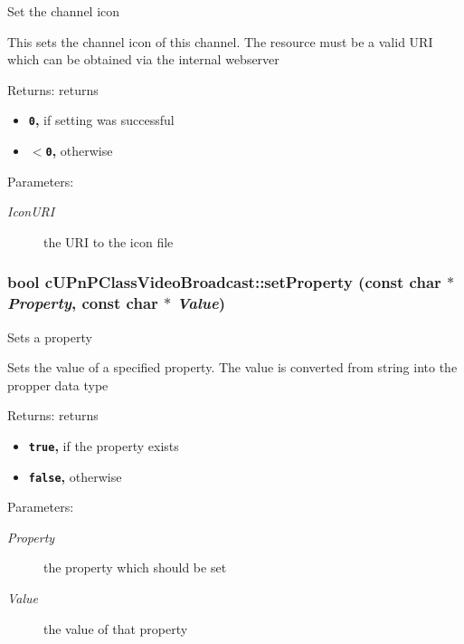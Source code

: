 Set the channel icon

This sets the channel icon of this channel. The resource must be a valid URI which can be obtained via the internal webserver

\begin{Desc}
\item[Returns:]returns\begin{itemize}
\item {\bf {\tt 0},} if setting was successful\item {\bf {\tt $<$0},} otherwise \end{itemize}
\end{Desc}
\begin{Desc}
\item[Parameters:]
\begin{description}
\item[{\em IconURI}]the URI to the icon file \end{description}
\end{Desc}
\hypertarget{classcUPnPClassVideoBroadcast_ce7a341834e448479d3c8f4f0254ce43}{
\subsubsection[{setProperty}]{\setlength{\rightskip}{0pt plus 5cm}bool cUPnPClassVideoBroadcast::setProperty (const char $\ast$ {\em Property}, \/  const char $\ast$ {\em Value})}}
\label{classcUPnPClassVideoBroadcast_ce7a341834e448479d3c8f4f0254ce43}


Sets a property

Sets the value of a specified property. The value is converted from string into the propper data type

\begin{Desc}
\item[Returns:]returns\begin{itemize}
\item {\bf {\tt true},} if the property exists\item {\bf {\tt false},} otherwise \end{itemize}
\end{Desc}
\begin{Desc}
\item[Parameters:]
\begin{description}
\item[{\em Property}]the property which should be set \item[{\em Value}]the value of that property \end{description}
\end{Desc}


